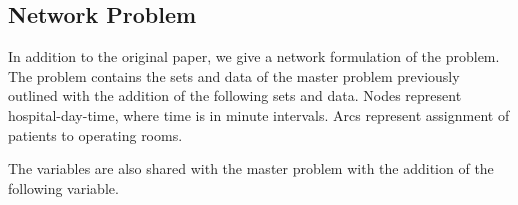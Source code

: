 \subsection{Network Problem}
In addition to the original paper, we give a network formulation of the problem. The problem contains the sets
and data of the master problem previously outlined with the addition of the following 
sets and data. Nodes represent hospital-day-time, where time is in minute intervals. Arcs represent assignment of patients to operating rooms.
\begin{table}[H]
    \caption*{\bf{SETS}}
    \end{table}
    \begin{table}[H]
        \caption*{\bf{DATA}}
        \end{table}
    The variables are also shared with the master problem with the addition of the following variable. 
\begin{table}[H]
    \caption*{\bf{VARIABLES}}
    \label{tab:NETvariables}
    \end{table}

